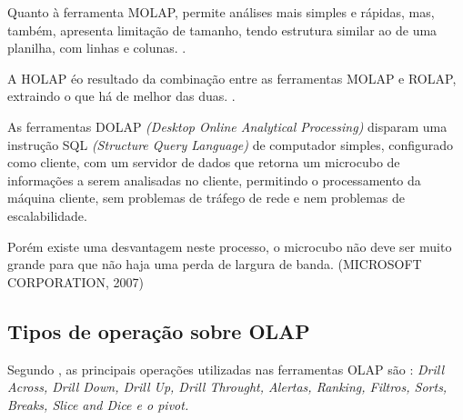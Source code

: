 Quanto \`{a} ferramenta MOLAP, permite an\'{a}lises mais simples e r\'{a}pidas, mas, tamb\'{e}m, apresenta limita\c{c}\~{a}o de tamanho, tendo estrutura similar ao de uma planilha, com linhas e colunas. \cite{olap-microsoft-2020}.

A HOLAP \'{e}o resultado da combina\c{c}\~{a}o entre as ferramentas MOLAP e ROLAP, extraindo o que h\'{a} de melhor das duas. \cite{olap-microsoft-2020}.

As ferramentas DOLAP \textit{(Desktop Online Analytical Processing)} disparam uma instru\c{c}\~{a}o
SQL \textit{(Structure Query Language)} de computador simples, configurado como cliente, com um servidor de dados que retorna um microcubo de informa\c{c}\~{o}es a serem analisadas no cliente, permitindo o processamento da m\'{a}quina cliente, sem problemas de tr\'{a}fego de rede e nem problemas de escalabilidade. 

Por\'{e}m existe uma desvantagem neste processo, o microcubo n\~{a}o deve ser muito grande para que n\~{a}o haja uma perda de largura de banda. (MICROSOFT CORPORATION, 2007)

\subsection{Tipos de opera\c{c}\~{a}o sobre OLAP}

Segundo \cite{olap-ballard-2006}, as principais opera\c{c}\~{o}es utilizadas nas ferramentas OLAP s\~{a}o : \textit{Drill Across, Drill Down, Drill Up, Drill Throught, Alertas, Ranking, Filtros, Sorts, Breaks, Slice and Dice e o pivot.}

